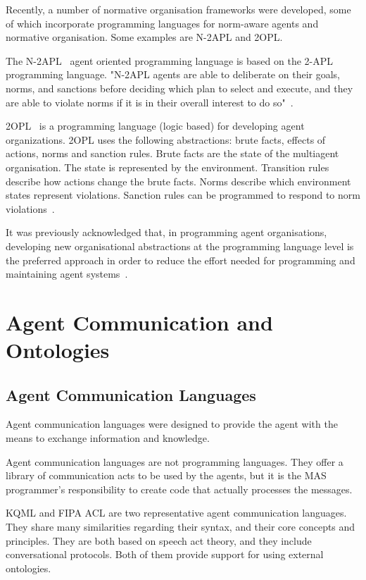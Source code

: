 \documentclass[a4paper,12pt,oneside,fleqn]{book} %
\begin{document}
Recently, a number of normative organisation frameworks were developed,
some of which incorporate programming languages for norm-aware agents and
normative organisation. Some examples are N-2APL and 2OPL.

The N-2APL~\cite{DBLP:conf/aamas/AlechinaDL12} agent oriented programming
language is based on the 2-APL programming language. "N-2APL agents are able
to deliberate on their goals, norms, and sanctions before deciding which
plan to select and execute, and they are able to violate norms if it is in
their overall interest to do so"~\cite{DBLP:conf/atal/DybalovaTDL13}.

2OPL~\cite{DBLP:conf/atal/DybalovaTDL13} is a programming language (logic
based) for developing agent organizations.  2OPL uses the following
abstractions: brute facts, effects of actions, norms and sanction rules.
Brute facts are the state of the multiagent organisation. The state is
represented by the environment.  Transition rules describe how
actions change the brute facts. Norms describe which environment states
represent violations.  Sanction rules can be programmed to respond to norm
violations~\cite{dastani2009programming}. 

It was previously acknowledged that, in programming agent organisations,
developing new organisational abstractions at the programming language
level is the preferred approach in order to reduce the effort needed for
programming and maintaining agent
systems~\cite{DBLP:conf/esaw/RiemsdijkHJ09}.


\chapter{Agent Communication and Ontologies} %

\section{Agent Communication Languages} %
Agent communication languages were designed to provide the agent with the 
means to exchange information and knowledge.

Agent communication languages are not programming languages. They offer a
library of communication acts to be used by the agents, but it is the MAS
programmer's responsibility to create code that actually processes the
messages.

KQML and FIPA ACL are two representative agent communication
languages. They share many similarities regarding their syntax, and their
core concepts and principles. They are both based on speech act theory, and
they include conversational protocols. Both of them provide support for
using external ontologies.
\end{document}
